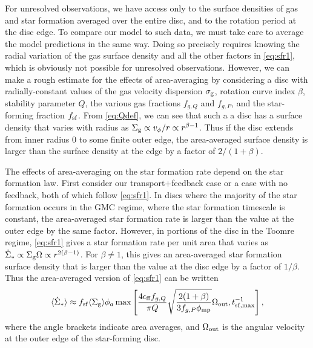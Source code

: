 \documentclass[useAMS,usenatbib]{mn2e}
\newcommand{\phimp}{\phi_{\mathrm{mp}}}
\begin{document}
For unresolved observations, we have access only to the surface densities of gas and star formation averaged over the entire disc, and to the rotation period at the disc edge. To compare our model to such data, we must take care to average the model predictions in the same way. Doing so precisely requires knowing the radial variation of the gas surface density and all the other factors in \autoref{eq:sfr1}, which is obviously not possible for unresolved observations. However, we can make a rough estimate for the effects of area-averaging by considering a disc with radially-constant values of the gas velocity dispersion $\sigma_{\rm g}$, rotation curve index $\beta$, stability parameter $Q$, the various gas fractions $f_{g,Q}$ and $f_{g,P}$, and the star-forming fraction $f_{\rm sf}$. From \autoref{eq:Qdef}, we can see that such a a disc has a surface density that varies with radius as $\Sigma_{\rm g} \propto v_\phi/r \propto r^{\beta-1}$. Thus if the disc extends from inner radius 0 to some finite outer edge, the area-averaged surface density is larger than the surface density at the edge by a factor of $2/(1+\beta)$. 

The effects of area-averaging on the star formation rate depend on the star formation law. First consider our transport+feedback case or a case with no feedback, both of which follow \autoref{eq:sfr1}. In discs where the majority of the star formation occurs in the GMC regime, where the star formation timescale is constant, the area-averaged star formation rate is larger than the value at the outer edge by the same factor. However, in portions of the disc in the Toomre regime, \autoref{eq:sfr1} gives a star formation rate per unit area that varies as $\dot{\Sigma}_* \propto \Sigma_{\rm g} \Omega \propto r^{2(\beta-1)}$. For $\beta \neq 1$, this gives an area-averaged star formation surface density that is larger than the value at the disc edge by a factor of $1/\beta$. Thus the area-averaged version of \autoref{eq:sfr1} can be written
\begin{equation}
\label{eq:sfr_averaged}
\langle\dot{\Sigma}_*\rangle \approx f_{\rm sf} \langle \Sigma_{\rm g}\rangle \phi_a \max\left[\frac{4 \epsilon_{\rm ff} f_{g,Q}}{\pi Q} \sqrt{\frac{2(1+\beta)}{3 f_{g,P} \phimp}} \Omega_{\rm out}, t_{\rm sf,max}^{-1}\right],
\end{equation}
where the angle brackets indicate area averages, and $\Omega_{\rm out}$ is the angular velocity at the outer edge of the star-forming disc.
\end{document}
